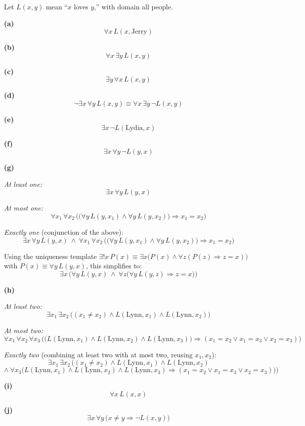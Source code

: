 \documentclass[11pt]{article}
\begin{document}
\begin{solution}
Let $L(x,y)$ mean ``$x$ loves $y$,'' with domain all people.

\medskip
\noindent\textbf{(a)}
\[
\forall x\, L(x,\text{Jerry})
\]

\medskip
\noindent\textbf{(b)}
\[
\forall x\,\exists y\, L(x,y)
\]

\medskip
\noindent\textbf{(c)}
\[
\exists y\,\forall x\, L(x,y)
\]

\medskip
\noindent\textbf{(d)}
\[
\neg\exists x\,\forall y\, L(x,y) \equiv \forall x\,\exists y\,\neg L(x,y)
\]

\medskip
\noindent\textbf{(e)}
\[
\exists x\,\neg L(\text{Lydia},x)
\]

\medskip
\noindent\textbf{(f)}
\[
\exists x\,\forall y\,\neg L(y,x)
\]

\medskip
\noindent\textbf{(g)}

\textit{At least one:}
\[
\exists x\,\forall y\, L(y,x)
\]

\textit{At most one:}
\[
\forall x_1\,\forall x_2\,\Big(\big(\forall y\, L(y,x_1)\wedge \forall y\, L(y,x_2)\big)\Rightarrow x_1=x_2\Big)
\]

\textit{Exactly one} (conjunction of the above):
\[
\exists x\,\forall y\, L(y,x)\ \wedge\ \forall x_1\,\forall x_2\,\Big(\big(\forall y\, L(y,x_1)\wedge \forall y\, L(y,x_2)\big)\Rightarrow x_1=x_2\Big)
\]

Using the uniqueness template $\exists! x\, P(x) \equiv \exists x\big(P(x)\wedge\forall z(P(z)\Rightarrow z=x)\big)$ with $P(x) \equiv \forall y\, L(y,x)$, this simplifies to:
\[
\exists x\,\Big(\forall y\, L(y,x)\ \wedge\ \forall z\big(\forall y\, L(y,z)\Rightarrow z=x\big)\Big)
\]

\medskip
\noindent\textbf{(h)}

\textit{At least two:}
\[
\exists x_1\,\exists x_2\,\big((x_1\neq x_2)\wedge L(\text{Lynn},x_1)\wedge L(\text{Lynn},x_2)\big)
\]

\textit{At most two:}
\[
\forall x_1\,\forall x_2\,\forall x_3\,\Big(\big(L(\text{Lynn},x_1)\wedge L(\text{Lynn},x_2)\wedge L(\text{Lynn},x_3)\big)\Rightarrow(x_1=x_2\vee x_1=x_3\vee x_2=x_3)\Big)
\]

\textit{Exactly two} (combining at least two with at most two, reusing $x_1,x_2$):
\[
\exists x_1\,\exists x_2\,\Big((x_1\neq x_2)\wedge L(\text{Lynn},x_1)\wedge L(\text{Lynn},x_2)
\]
\[
\wedge\ \forall x_3\big(L(\text{Lynn},x_1)\wedge L(\text{Lynn},x_2)\wedge L(\text{Lynn},x_3)\Rightarrow(x_1=x_2\vee x_1=x_3\vee x_2=x_3)\big)\Big)
\]

\medskip
\noindent\textbf{(i)}
\[
\forall x\, L(x,x)
\]

\medskip
\noindent\textbf{(j)}
\[
\exists x\,\forall y\,\big(x\neq y \Rightarrow \neg L(x,y)\big)
\]
\end{solution}
\end{document}
